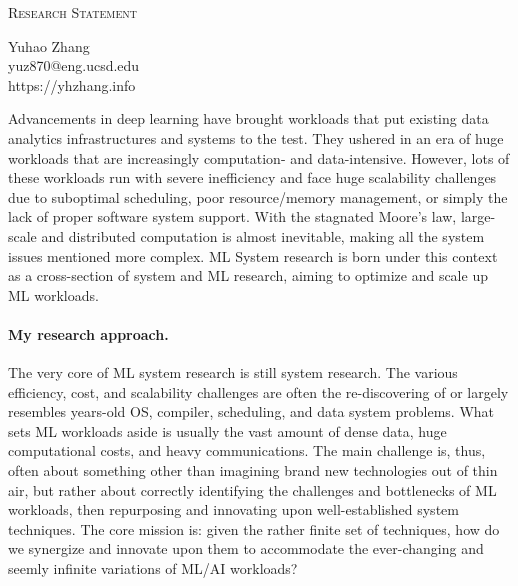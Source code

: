 \documentclass[letterpaper]{article}
\makeatletter
\newcommand{\soptitle}{Research Statement}
\newcommand{\yourname}{Yuhao Zhang}
\newcommand{\youremail}{yuz870@eng.ucsd.edu}
\newcommand{\amper}{{\fontspec[Scale=1]{Adobe Caslon Pro}\selectfont\itshape\&~{}}}
\makeatother
\begin{document}
\begin{center}{\huge \scshape \soptitle}\end{center}
\begin{center}\vspace{0.2em} {\Large \yourname\\}
  {\youremail\\} {https://yhzhang.info}\end{center}

\noindent Advancements in deep learning have brought workloads that put existing data analytics infrastructures and systems to the test. They ushered in an era of huge workloads that are increasingly computation- and data-intensive. However, lots of these workloads run with severe inefficiency and face huge scalability challenges due to suboptimal scheduling, poor resource/memory management, or simply the lack of proper software system support. With the stagnated Moore's law, large-scale and distributed computation is almost inevitable, making all the system issues mentioned more complex. ML System research is born under this context as a cross-section of system and ML research, aiming to optimize and scale up ML workloads.

\paragraph{My research approach.} The very core of ML system research is still system research. The various efficiency, cost, and scalability challenges are often the re-discovering of or largely resembles years-old OS, compiler, scheduling, and data system problems. What sets ML workloads aside is usually the vast amount of dense data, huge computational costs, and heavy communications. The main challenge is, thus, often about something other than imagining brand new technologies out of thin air, but rather about correctly identifying the challenges and bottlenecks of ML workloads, then repurposing and innovating upon well-established system techniques. The core mission is: given the rather finite set of techniques, how do we synergize and innovate upon them to accommodate the ever-changing and seemly infinite variations of ML/AI workloads? 
\end{document}

